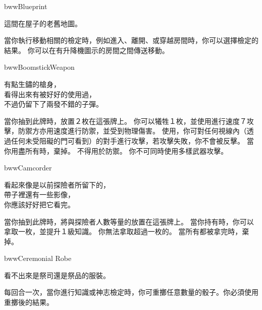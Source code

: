 %
\begin{ItemCard}{bww}{Blueprint}{}
  \begin{CardStory}
    這間在屋子的老舊地圖。
  \end{CardStory}
  當你執行移動相關的檢定時，例如進入、離開、或穿越房間時，你可以選擇檢定的結果。\smallbreak
  你可以在有升降機圖示的房間之間傳送移動。\smallbreak
\end{ItemCard}%
\linebreak[0]%
\begin{ItemCard}{bww}{Boomstick}{Weapon}
  \begin{CardStory}
    有點生鏽的槍身，\\
    看得出來有被好好的使用過，\\
    不過仍留下了兩發不錯的子彈。
  \end{CardStory}
  當你抽到此牌時，放置２枚在這張牌上。\smallbreak
  你可以犧牲１枚，並使用\ThisName{}進行速度７攻擊，防禦方亦用速度進行防禦，並受到物理傷害。\smallbreak
  使用\ThisName{}，你可對任何視線內（透過任何未受阻礙的門可看到）的對手進行攻擊，若攻擊失敗，你不會被反擊。\smallbreak
  當你用盡所有時，棄掉\ThisName{}。\smallbreak
  \ThisName{}不得用於防禦。\smallbreak
  你不可同時使用多樣武器攻擊。\smallbreak
\end{ItemCard}%
\linebreak[0]%
\begin{ItemCard}{bww}{Camcorder}{}
  \begin{CardStory}
    看起來像是以前探險者所留下的，\\
    帶子裡還有一些影像，\\
    你應該好好把它看完。
  \end{CardStory}
  當你抽到此牌時，將與探險者人數等量的放置在這張牌上。\smallbreak
  當你持有\ThisName{}時，你可以拿取一枚，並提升１級知識。\smallbreak
  你無法拿取超過一枚的。\smallbreak
  當所有都被拿完時，棄掉\ThisName{}。\smallbreak
\end{ItemCard}%
\linebreak[0]%
\begin{ItemCard}{bww}{Ceremonial Robe}{}
  \begin{CardStory}
    看不出來是祭司還是祭品的服裝。
  \end{CardStory}
  每回合一次，當你進行知識或神志檢定時，你可重擲任意數量的骰子。你必須使用重擲後的結果。\smallbreak
\end{ItemCard}%
